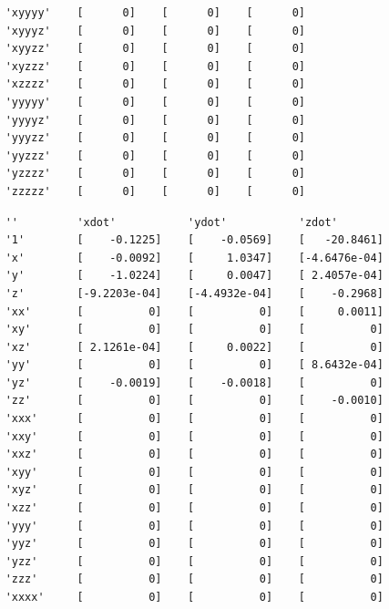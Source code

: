 \documentclass[onecolumn,11pt]{article}
\begin{document}
\begin{table}[where]
\begin{center}
{\begin{verbatim}
    'xyyyy'    [      0]    [      0]    [      0]
    'xyyyz'    [      0]    [      0]    [      0]
    'xyyzz'    [      0]    [      0]    [      0]
    'xyzzz'    [      0]    [      0]    [      0]
    'xzzzz'    [      0]    [      0]    [      0]
    'yyyyy'    [      0]    [      0]    [      0]
    'yyyyz'    [      0]    [      0]    [      0]
    'yyyzz'    [      0]    [      0]    [      0]
    'yyzzz'    [      0]    [      0]    [      0]
    'yzzzz'    [      0]    [      0]    [      0]
    'zzzzz'    [      0]    [      0]    [      0]
\end{verbatim}
}
\end{center}
\end{table}


\begin{table}[where!]
\caption{\small Dynamics of cylinder wake modes using sparse representation.  Notice that quadratic terms are identified.}\label{Tab:Cylinder}
\begin{center}
\vspace{-.15in}
{\footnotesize
\begin{verbatim}
    ''         'xdot'           'ydot'           'zdot'       
    '1'        [    -0.1225]    [    -0.0569]    [   -20.8461]
    'x'        [    -0.0092]    [     1.0347]    [-4.6476e-04]
    'y'        [    -1.0224]    [     0.0047]    [ 2.4057e-04]
    'z'        [-9.2203e-04]    [-4.4932e-04]    [    -0.2968]
    'xx'       [          0]    [          0]    [     0.0011]
    'xy'       [          0]    [          0]    [          0]
    'xz'       [ 2.1261e-04]    [     0.0022]    [          0]
    'yy'       [          0]    [          0]    [ 8.6432e-04]
    'yz'       [    -0.0019]    [    -0.0018]    [          0]
    'zz'       [          0]    [          0]    [    -0.0010]
    'xxx'      [          0]    [          0]    [          0]
    'xxy'      [          0]    [          0]    [          0]
    'xxz'      [          0]    [          0]    [          0]
    'xyy'      [          0]    [          0]    [          0]
    'xyz'      [          0]    [          0]    [          0]
    'xzz'      [          0]    [          0]    [          0]
    'yyy'      [          0]    [          0]    [          0]
    'yyz'      [          0]    [          0]    [          0]
    'yzz'      [          0]    [          0]    [          0]
    'zzz'      [          0]    [          0]    [          0]
    'xxxx'     [          0]    [          0]    [          0]

\end{verbatim}}
\end{center}
\end{table}
\end{document}
